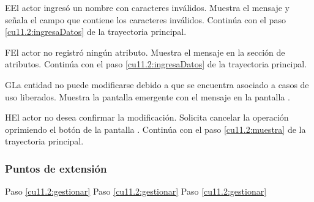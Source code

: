  \begin{UCtrayectoriaA}{E}{El actor ingresó un nombre con caracteres inválidos.}
    \UCpaso[\UCsist] Muestra el mensaje  y señala el campo que contiene los caracteres inválidos.
    \UCpaso[] Continúa con el paso \ref{cu11.2:ingresaDatos} de la trayectoria principal.
 \end{UCtrayectoriaA}
 \begin{UCtrayectoriaA}{F}{El actor no registró ningún atributo.}
    \UCpaso[\UCsist] Muestra el mensaje  en la sección de atributos.
    \UCpaso[] Continúa con el paso \ref{cu11.2:ingresaDatos} de la trayectoria principal.
 \end{UCtrayectoriaA}
 \begin{UCtrayectoriaA}{G}{La entidad no puede modificarse debido a que se encuentra asociado a casos de uso liberados.}
    \UCpaso[\UCsist] Muestra la pantalla emergente con el mensaje  en la pantalla .
 \end{UCtrayectoriaA}
 \begin{UCtrayectoriaA}{H}{El actor no desea confirmar la modificación.}
    \UCpaso[\UCactor] Solicita cancelar la operación oprimiendo el botón  de la pantalla .
    \UCpaso[] Continúa con el paso \ref{cu11.2:muestra} de la trayectoria principal.
 \end{UCtrayectoriaA}
\subsubsection{Puntos de extensión}
 
	{Paso \ref{cu11.2:gestionar}}
	{}
	{Paso \ref{cu11.2:gestionar}}
	{}	
	{Paso \ref{cu11.2:gestionar}}
	{}
